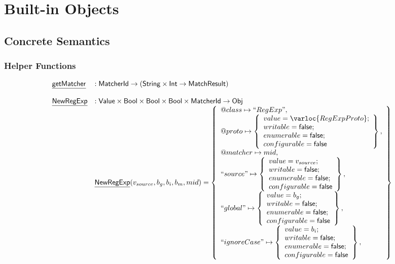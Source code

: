 
\chapter{Built-in Objects}
\section{Concrete Semantics}

\subsection{Helper Functions}
\[
\begin{array}{ll}
  \chf{getMatcher} & : \matcher \rightarrow (\SF{String} \times \SF{Int} \rightarrow \SF{MatchResult}) \\
\\
  \chf{NewRegExp} & : \SF{Value} \times \SF{Bool} \times \SF{Bool} \times \SF{Bool} \times \matcher \rightarrow \SF{Obj} \\
  & \chf{NewRegExp}(v_{source}, b_g, b_i, b_m, mid)
  = \set{
    \varprop{class}\mapsto ``RegExp",\\
    \varprop{proto}\mapsto
    \set{
      value=\varloc{RegExpProto};\\
      writable=\vfalse;\\
      enumerable=\vfalse;\\
      configurable=\vfalse\\
    },\\
    \varprop{matcher}\mapsto mid,\\
    ``source"\mapsto
    \set{
      value=v_{source};\\
      writable=\vfalse;\\
      enumerable=\vfalse;\\
      configurable=\vfalse\\
    },\\
    ``global"\mapsto
    \set{
      value=b_g;\\
      writable=\vfalse;\\
      enumerable=\vfalse;\\
      configurable=\vfalse\\
    },\\
    ``ignoreCase"\mapsto
    \set{
      value=b_i;\\
      writable=\vfalse;\\
      enumerable=\vfalse;\\
      configurable=\vfalse\\
    },\\
}
\end{array}\]
